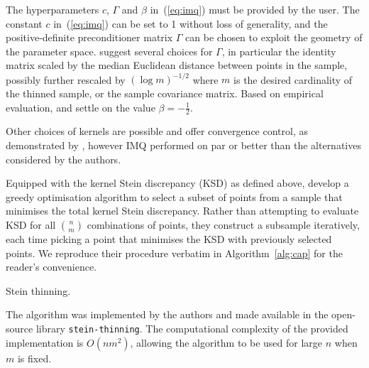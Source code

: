 \documentclass[11pt,a4paper]{report}
\DeclareMathOperator*{\argmin}{arg\,min}
\begin{document}

The hyperparameters $c$, $\Gamma$ and $\beta$ in~(\ref{eq:imq}) must be provided by the user. The constant $c$ in~(\ref{eq:imq}) can be set to 1 without loss of generality, and the positive-definite preconditioner matrix $\Gamma$ can be chosen to exploit the geometry of the parameter space. \cite{riabizOptimalThinningMCMC2022} suggest several choices for $\Gamma$, in particular the identity matrix scaled by the median Euclidean distance between points in the sample, possibly further rescaled by $(\log m)^{-1/2}$ where $m$ is the desired cardinality of the thinned sample, or the sample covariance matrix. Based on empirical evaluation, \cite{gorhamMeasuringSampleQuality2017} and \cite{riabizOptimalThinningMCMC2022} settle on the value $\beta = -\frac12$.

Other choices of kernels are possible and offer convergence control, as demonstrated by \cite{chenSteinPoints2018}, however IMQ performed on par or better than the alternatives considered by the authors.

Equipped with the kernel Stein discrepancy (KSD) as defined above, \cite{riabizOptimalThinningMCMC2022} develop a greedy optimisation algorithm to select a subset of points from a sample that minimises the total kernel Stein discrepancy. Rather than attempting to evaluate KSD for all $n \choose m$ combinations of points, they construct a subsample iteratively, each time picking a point that minimises the KSD with previously selected points. We reproduce their procedure verbatim in Algorithm~\ref{alg:cap} for the reader's convenience. 

\begin{algorithm}[t]
\caption{Stein thinning.}\label{alg:cap}

\For{$j = 1, \dots, m$}{
$$\pi(j) \in \argmin_{i=1,\dots,n} \frac{k_P(x_i, x_i)}{2} + \sum_{j'=1}^{j-1} k_P(x_{\pi(j'}, x_i)$$
}
\end{algorithm}

The algorithm was implemented by the authors and made available in the open-source library \texttt{stein-thinning}. The computational complexity of the provided implementation is $O(nm^2)$, allowing the algorithm to be used for large $n$ when $m$ is fixed.
\end{document}
